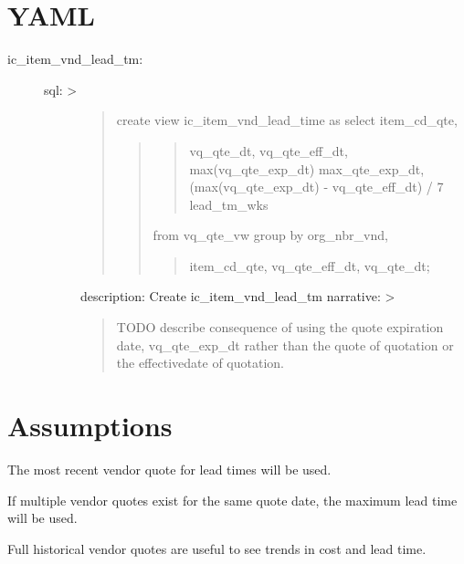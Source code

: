 \documentclass[letterpaper,10pt,english]{sphinxmanual}
\begin{document}
\section{YAML}
\label{\detokenize{LeadTimeByVendor:yaml}}\begin{description}
\item[{ic\_item\_vnd\_lead\_tm:}] \leavevmode\begin{description}
\item[{sql: \textgreater{}}] \leavevmode\begin{quote}

create view ic\_item\_vnd\_lead\_time as
select item\_cd\_qte,
\begin{quote}
\begin{quote}

vq\_qte\_dt,
vq\_qte\_eff\_dt,
max(vq\_qte\_exp\_dt) max\_qte\_exp\_dt,
(max(vq\_qte\_exp\_dt) - vq\_qte\_eff\_dt) / 7 lead\_tm\_wks
\end{quote}

from vq\_qte\_vw
group by org\_nbr\_vnd,
\begin{quote}

item\_cd\_qte,
vq\_qte\_eff\_dt,
vq\_qte\_dt;
\end{quote}
\end{quote}
\end{quote}

description: Create ic\_item\_vnd\_lead\_tm
narrative: \textgreater{}
\begin{quote}

TODO describe consequence of using the quote expiration date, vq\_qte\_exp\_dt
rather than the quote of quotation or the effectivedate of quotation.
\end{quote}

\end{description}

\end{description}


\section{Assumptions}
\label{\detokenize{LeadTimeByVendor:assumptions}}
The most recent vendor quote for lead times will be used.

If multiple vendor quotes exist for the same quote date, the maximum
lead time will be used.

Full historical vendor quotes are useful to see trends in cost and lead
time.
\end{document}
